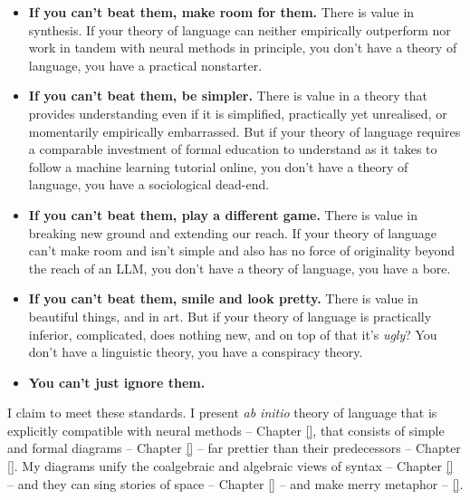 \begin{itemize}
\item{\textbf{If you can't beat them, make room for them.} There is value in synthesis. If your theory of language can neither empirically outperform nor work in tandem with neural methods in principle, you don't have a theory of language, you have a practical nonstarter.}
\item{\textbf{If you can't beat them, be simpler.} There is value in a theory that provides understanding even if it is simplified, practically yet unrealised, or momentarily empirically embarrassed. But if your theory of language requires a comparable investment of formal education to understand as it takes to follow a machine learning tutorial online, you don't have a theory of language, you have a sociological dead-end.}
\item{\textbf{If you can't beat them, play a different game.} There is value in breaking new ground and extending our reach. If your theory of language can't make room and isn't simple and also has no force of originality beyond the reach of an LLM, you don't have a theory of language, you have a bore.}
\item{\textbf{If you can't beat them, smile and look pretty.} There is value in beautiful things, and in art. But if your theory of language is practically inferior, complicated, does nothing new, and on top of that it's \emph{ugly}? You don't have a linguistic theory, you have a conspiracy theory.}
\item{\textbf{You can't just ignore them.}}
\end{itemize}

I claim to meet these standards. I present \emph{ab initio} theory of language that is explicitly compatible with neural methods -- Chapter \ref{}, that consists of simple and formal diagrams -- Chapter \ref{} -- far prettier than their predecessors -- Chapter \ref{}. My diagrams unify the coalgebraic and algebraic views of syntax -- Chapter \ref{} -- and they can sing stories of space -- Chapter \ref{} -- and make merry metaphor -- \ref{}.